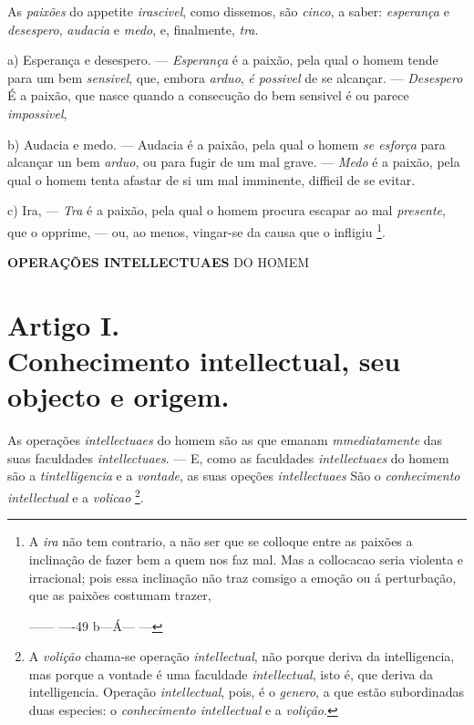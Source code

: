 
 
As \emph{paixões} do appetite \emph{irascivel}, como dissemos, são \emph{cinco}, a saber: \emph{esperança} e \emph{desespero}, \emph{audacia} e \emph{medo}, e, finalmente, \emph{tra}.

a) Esperança e desespero. --- \emph{Esperança} é a paixão, pela qual o homem tende para um bem \emph{sensivel}, que, embora \emph{arduo}, \emph{é possivel} de se alcançar. --- \emph{Desespero} É a paixão, que nasce quando a consecução do bem sensivel é ou parece \emph{impossivel},

b) Audacia e medo. --- Audacia é a paixão, pela qual o homem \emph{se esforça} para alcançar un bem \emph{arduo}, ou para fugir de um mal grave. --- \emph{Medo} é a paixão, pela qual o homem tenta afastar de si um mal imminente, diffieil de se evitar.

c) Ira, --- \emph{Tra} é a paixão, pela qual o homem procura escapar ao mal \emph{presente}, que o opprime, --- ou, ao menos, vingar-se da causa que o infligiu \footnote{A \emph{ira} não tem contrario, a não ser que se colloque entre as paixões a inclinação de fazer bem a quem nos faz mal. Mas a collocacao seria violenta e irracional; pois essa inclinação não traz comsigo a emoção ou á perturbação, que as paixões costumam trazer,\par ------ ----49 b---Á--- ---}.

\textbf{OPERAÇÕES INTELLECTUAES} DO HOMEM


\section*{Artigo I.\\ Conhecimento intellectual, seu objecto e origem.}


  
As operações \emph{intellectuaes} do homem são as que emanam \emph{mmediatamente} das suas faculdades \emph{intellectuaes}. --- E, como as faculdades \emph{intellectuaes} do homem são a \emph{tintelligencia} e a \emph{vontade}, as suas opeções \emph{intellectuaes} São o \emph{conhecimento intellectual} e a \emph{volicao} \footnote{A \emph{volição} chama-se operação \emph{intellectual}, não porque deriva da intelligencia, mas porque a vontade é uma faculdade \emph{intellectual}, isto é, que deriva da intelligencia. Operação \emph{intellectual}, pois, é o \emph{genero}, a que estão subordinadas duas especies: o \emph{conhecimento intellectual} e a \emph{volição}.}.

